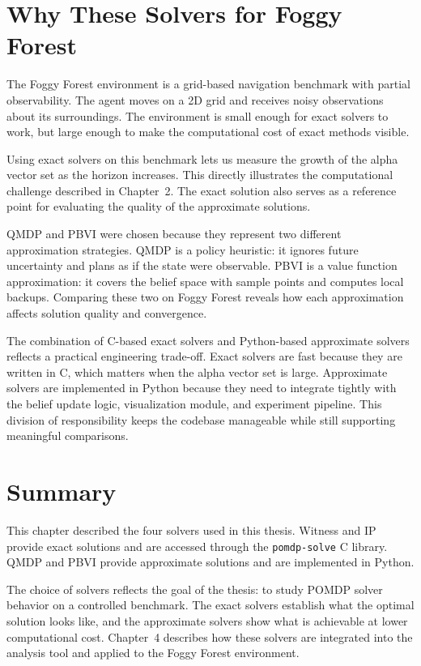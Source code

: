 \section{Why These Solvers for Foggy Forest}
\label{sec:justify}

The Foggy Forest environment is a grid-based navigation benchmark with partial observability.
The agent moves on a 2D grid and receives noisy observations about its surroundings.
The environment is small enough for exact solvers to work, but large enough to make the computational cost of exact methods visible.

Using exact solvers on this benchmark lets us measure the growth of the alpha vector set as the horizon increases.
This directly illustrates the computational challenge described in Chapter~2.
The exact solution also serves as a reference point for evaluating the quality of the approximate solutions.

QMDP and PBVI were chosen because they represent two different approximation strategies.
QMDP is a policy heuristic: it ignores future uncertainty and plans as if the state were observable.
PBVI is a value function approximation: it covers the belief space with sample points and computes local backups.
Comparing these two on Foggy Forest reveals how each approximation affects solution quality and convergence.

The combination of C-based exact solvers and Python-based approximate solvers reflects a practical engineering trade-off.
Exact solvers are fast because they are written in C, which matters when the alpha vector set is large.
Approximate solvers are implemented in Python because they need to integrate tightly with the belief update logic, visualization module, and experiment pipeline.
This division of responsibility keeps the codebase manageable while still supporting meaningful comparisons.


\section{Summary}
\label{sec:summary3}

This chapter described the four solvers used in this thesis.
Witness and IP provide exact solutions and are accessed through the \texttt{pomdp-solve} C library.
QMDP and PBVI provide approximate solutions and are implemented in Python.

The choice of solvers reflects the goal of the thesis: to study POMDP solver behavior on a controlled benchmark.
The exact solvers establish what the optimal solution looks like, and the approximate solvers show what is achievable at lower computational cost.
Chapter~4 describes how these solvers are integrated into the analysis tool and applied to the Foggy Forest environment.
